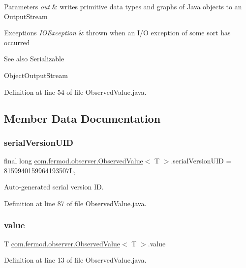 \begin{DoxyParams}{Parameters}
{\em out} & writes primitive data types and graphs of Java objects to an Output\+Stream \\
\hline
\end{DoxyParams}

\begin{DoxyExceptions}{Exceptions}
{\em I\+O\+Exception} & thrown when an I/O exception of some sort has occurred \\
\hline
\end{DoxyExceptions}
\begin{DoxySeeAlso}{See also}
Serializable 

Object\+Output\+Stream 
\end{DoxySeeAlso}


Definition at line 54 of file Observed\+Value.\+java.



\subsection{Member Data Documentation}
\mbox{\label{a00034_ad494135b9a0d52423069327f49e93937}} 
\subsubsection{\texorpdfstring{serialVersionUID}{serialVersionUID}}
{\footnotesize\ttfamily final long \mbox{\hyperlink{a00034}{com.\+fermod.\+observer.\+Observed\+Value}}$<$ T $>$.serial\+Version\+U\+ID = 8159940159964193507L\hspace{0.3cm}{\ttfamily [static]}, {\ttfamily [private]}}



Auto-\/generated serial version ID. 



Definition at line 87 of file Observed\+Value.\+java.

\mbox{\label{a00034_a947edfec1982817155067f495b0c8cf7}} 
\subsubsection{\texorpdfstring{value}{value}}
{\footnotesize\ttfamily T \mbox{\hyperlink{a00034}{com.\+fermod.\+observer.\+Observed\+Value}}$<$ T $>$.value\hspace{0.3cm}{\ttfamily [private]}}



Definition at line 13 of file Observed\+Value.\+java.

